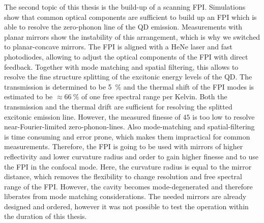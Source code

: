 The second topic of this thesis is the build-up of a scanning \ac{FPI}.
Simulations show that common optical components are sufficient to build up an \ac{FPI} which is able to resolve the zero-phonon line of the \ac{QD} emission.
Measurements with planar mirrors show the instability of this arrangement, which is why we switched to planar-concave mirrors.
The \ac{FPI} is aligned with a HeNe laser and fast photodiodes, allowing to adjust the optical components of the \ac{FPI} with direct feedback.
Together with mode matching and spatial filtering, this allows to resolve the fine structure splitting of the excitonic energy levels of the \ac{QD}.
The transmission is determined to be \SI{5}{\percent} and the thermal shift of the \ac{FPI} modes is estimated to be $\approx \SI{66}{\percent}$ of one free spectral range per Kelvin.
Both the transmission and the thermal drift are sufficient for resolving the splitted excitonic emission line. However, the measured finesse of $45$ is too low to resolve near-Fourier-limited zero-phonon-lines.
Also mode-matching and spatial-filtering is time consuming and error prone, which makes them impractical for common measurements.
Therefore, the \ac{FPI} is going to be used with mirrors of higher reflectivity and lower curvature radius and order to gain higher finesse and to use the \ac{FPI} in the confocal mode.
Here, the curvature radius is equal to the mirror distance, which removes the flexibility to change resolution and free spectral range of the \ac{FPI}.
However, the cavity becomes mode-degenerated and therefore liberates from mode matching considerations.
The needed mirrors are already designed and ordered, however it was not possible to test the operation within the duration of this thesis.
